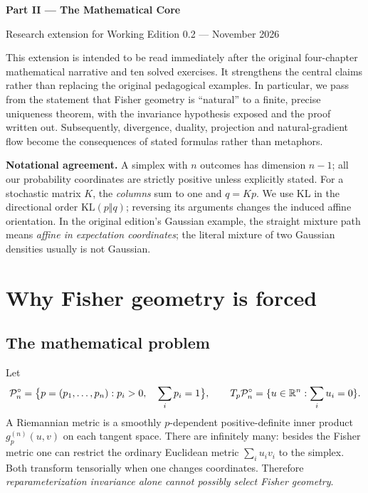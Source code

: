\documentclass[11pt]{article}
\theoremstyle{definition}\newtheorem{definition}[theorem]{Definition}\newtheorem{exercise}{Problem}[section]
\newcommand{\KL}{\mathrm{KL}}
\begin{document}
\begin{center}
{\Large\bfseries Part II --- The Mathematical Core}\par
\vspace{.3em}
{\small Research extension for Working Edition 0.2 --- November 2026}\par
\end{center}

This extension is intended to be read immediately after the original four-chapter mathematical narrative and ten solved exercises. It strengthens the central claims rather than replacing the original pedagogical examples. In particular, we pass from the statement that Fisher geometry is ``natural'' to a finite, precise uniqueness theorem, with the invariance hypothesis exposed and the proof written out. Subsequently, divergence, duality, projection and natural-gradient flow become the consequences of stated formulas rather than metaphors.

\textbf{Notational agreement.} A simplex with $n$ outcomes has dimension $n-1$; all our probability coordinates are strictly positive unless explicitly stated. For a stochastic matrix $K$, the \emph{columns} sum to one and $q=Kp$. We use KL in the directional order $\KL(p\Vert q)$; reversing its arguments changes the induced affine orientation. In the original edition's Gaussian example, the straight mixture path means \emph{affine in expectation coordinates}; the literal mixture of two Gaussian densities usually is not Gaussian.

\section{Why Fisher geometry is forced}

\subsection{The mathematical problem}

Let
\[
 \mathcal P_n^\circ=\bigl\{p=(p_1,\ldots,p_n):p_i>0,\quad\sum_i p_i=1\bigr\},
 \qquad T_p\mathcal P_n^\circ=\{u\in\mathbb R^n:\sum_i u_i=0\}.
\]
A Riemannian metric is a smoothly $p$-dependent positive-definite inner product $g^{(n)}_p(u,v)$ on each tangent space. There are infinitely many: besides the Fisher metric one can restrict the ordinary Euclidean metric $\sum_i u_iv_i$ to the simplex. Both transform tensorially when one changes coordinates. Therefore \emph{reparameterization invariance alone cannot possibly select Fisher geometry}.
\end{document}

